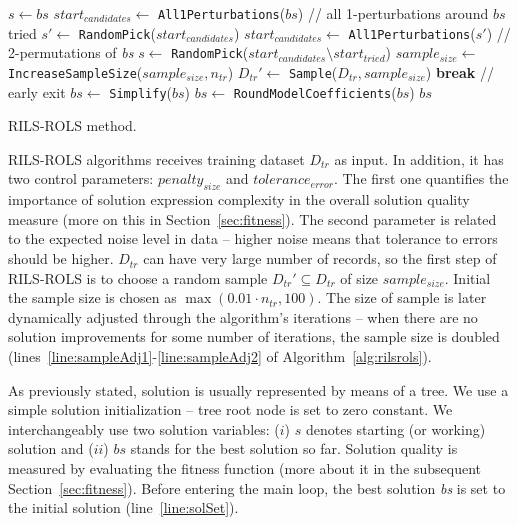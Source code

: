 \documentclass[a4paper,12pt]{elsarticle}
\begin{document}
\begin{algorithm}
\begin{algorithmic}[1]
		\EndFor
		\State $s \gets bs$ \label{line:improved}
		\Else
		\State $start_{candidates} \gets $ \texttt{All1Perturbations}($bs$)
		 // all 1-perturbations around $bs$ tried
		\State $s' \gets $ \texttt{RandomPick}($start_{candidates}$)  \label{line:pert21}
		\State $start_{candidates} \gets $ \texttt{All1Perturbations}($s'$) \label{line:pert22} // 2-permutations of \textit{bs}
		\EndIf
		\State $s \gets $ \texttt{RandomPick}($start_{candidates} \setminus start_{tried}$) \label{line:randPick}
		\State $sample_{size} \gets$ \texttt{IncreaseSampleSize}($sample_{size}, n_{tr}$) \label{line:sampleAdj1}
		\State $D_{tr}' \gets$ \texttt{Sample}($D_{tr}, sample_{size}$)\label{line:sampleAdj2}
		\EndIf
		\EndIf
		\State \textbf{break} // early exit
		\EndIf
		\EndWhile
		\State $bs \gets $ \texttt{Simplify}($bs$)
		\State $bs \gets $ \texttt{RoundModelCoefficients}($bs$)
		\State \Return $bs$
		\EndProcedure
	\end{algorithmic}
	\caption{\textsc{RILS}-\textsc{ROLS}  method.}
	\label{alg:rilsrols}
\end{algorithm}  

\textsc{RILS}-\textsc{ROLS}  algorithms receives training dataset $D_{tr}$ as input. In addition, it has two control parameters: $penalty_{size}$ and $tolerance_{error}$. The first one quantifies the importance of solution expression complexity in the overall solution quality measure (more on this in Section~\ref{sec:fitness}). The second parameter is related to the expected noise level in data -- higher noise means that tolerance to errors should be higher.
$D_{tr}$ can have very large number of records, so the first step of \textsc{RILS}-\textsc{ROLS}  is to choose a random sample $D_{tr}' \subseteq D_{tr}$ of size $sample_{size}$. Initial the sample size is chosen as $\max(0.01 \cdot n_{tr}, 100)$. The size of sample is later dynamically adjusted through the algorithm's iterations -- when there are no solution improvements for some number of iterations, the sample size is doubled (lines~\ref{line:sampleAdj1}-\ref{line:sampleAdj2} of Algorithm~\ref{alg:rilsrols}).

As previously stated, solution is usually represented by means of a tree. We use a simple solution initialization -- tree root node is set to zero constant. We interchangeably use two solution variables: ($i$) $s$ denotes starting (or working) solution and ($ii$) $bs$ stands for the best solution so far. Solution quality is measured by evaluating the fitness function (more about it in the subsequent Section~\ref{sec:fitness}). Before entering the main loop, the best solution \emph{bs} is set to the initial solution (line~\ref{line:solSet}). 
\end{document}
